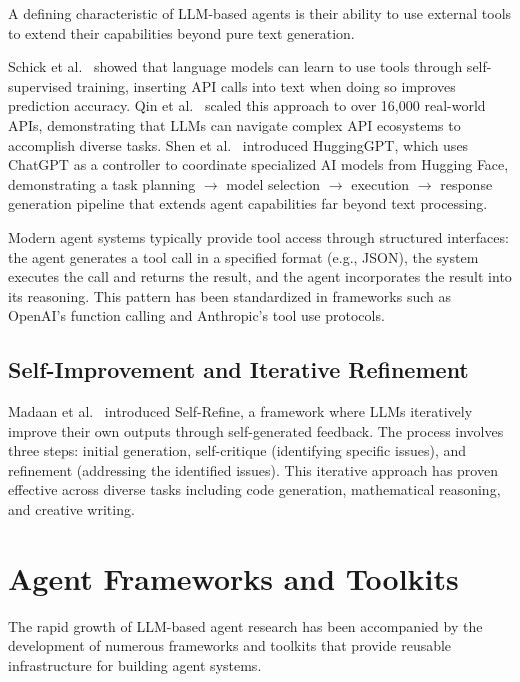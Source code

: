 \documentclass[11pt,a4paper]{article}
\begin{document}
A defining characteristic of LLM-based agents is their ability to use external tools to extend their capabilities beyond pure text generation.

Schick et al.~\citep{schick2024toolformer} showed that language models can learn to use tools through self-supervised training, inserting API calls into text when doing so improves prediction accuracy. Qin et al.~\citep{qin2023toolllm} scaled this approach to over 16,000 real-world APIs, demonstrating that LLMs can navigate complex API ecosystems to accomplish diverse tasks. Shen et al.~\citep{shen2023hugginggpt} introduced HuggingGPT, which uses ChatGPT as a controller to coordinate specialized AI models from Hugging Face, demonstrating a task planning $\rightarrow$ model selection $\rightarrow$ execution $\rightarrow$ response generation pipeline that extends agent capabilities far beyond text processing.

Modern agent systems typically provide tool access through structured interfaces: the agent generates a tool call in a specified format (e.g., JSON), the system executes the call and returns the result, and the agent incorporates the result into its reasoning. This pattern has been standardized in frameworks such as OpenAI's function calling and Anthropic's tool use protocols.

\subsection{Self-Improvement and Iterative Refinement}

Madaan et al.~\citep{madaan2024self} introduced Self-Refine, a framework where LLMs iteratively improve their own outputs through self-generated feedback. The process involves three steps: initial generation, self-critique (identifying specific issues), and refinement (addressing the identified issues). This iterative approach has proven effective across diverse tasks including code generation, mathematical reasoning, and creative writing.

\section{Agent Frameworks and Toolkits}
\label{sec:frameworks}

The rapid growth of LLM-based agent research has been accompanied by the development of numerous frameworks and toolkits that provide reusable infrastructure for building agent systems.
\end{document}
